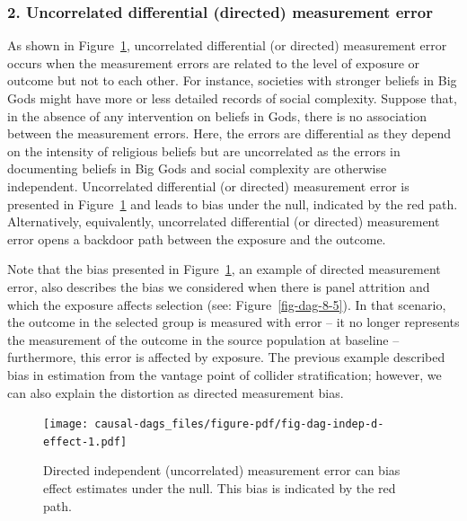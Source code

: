 \documentclass[
  singlecolumn]{article}
\begin{document}
\hypertarget{uncorrelated-differential-directed-measurement-error}{%
\subsubsection{2. Uncorrelated differential (directed) measurement
error}\label{uncorrelated-differential-directed-measurement-error}}

As shown in Figure~\ref{fig-dag-indep-d-effect}, uncorrelated
differential (or directed) measurement error occurs when the measurement
errors are related to the level of exposure or outcome but not to each
other. For instance, societies with stronger beliefs in Big Gods might
have more or less detailed records of social complexity. Suppose that,
in the absence of any intervention on beliefs in Gods, there is no
association between the measurement errors. Here, the errors are
differential as they depend on the intensity of religious beliefs but
are uncorrelated as the errors in documenting beliefs in Big Gods and
social complexity are otherwise independent. Uncorrelated differential
(or directed) measurement error is presented in
Figure~\ref{fig-dag-indep-d-effect} and leads to bias under the null,
indicated by the red path. Alternatively, equivalently, uncorrelated
differential (or directed) measurement error opens a backdoor path
between the exposure and the outcome.

Note that the bias presented in Figure~\ref{fig-dag-indep-d-effect}, an
example of directed measurement error, also describes the bias we
considered when there is panel attrition and which the exposure affects
selection (see: Figure~\ref{fig-dag-8-5}). In that scenario, the outcome
in the selected group is measured with error -- it no longer represents
the measurement of the outcome in the source population at baseline --
furthermore, this error is affected by exposure. The previous example
described bias in estimation from the vantage point of collider
stratification; however, we can also explain the distortion as directed
measurement bias.

\begin{figure}

{\centering \texttt{[image: causal-dags\_files/figure-pdf/fig-dag-indep-d-effect-1.pdf]}

}

\caption{\label{fig-dag-indep-d-effect}Directed independent
(uncorrelated) measurement error can bias effect estimates under the
null. This bias is indicated by the red path.}

\end{figure}
\end{document}
